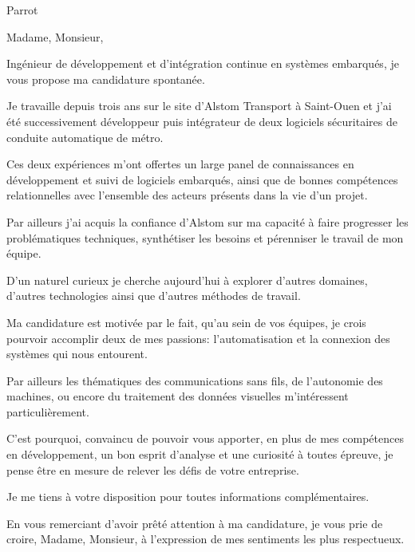 \documentclass[12pt]{lettre}
\makeatletter
\newcommand*{\NoRule}{\renewcommand*{\rule@length}{0}}
\makeatother
\begin{document}
\begin{letter}{Parrot}

  \def\concname{Objet :~}


  \signature{Hoel IRIS}
  \address{Hoel IRIS\\
  54 avenue Mathurin Moreau\\
  75019 Paris\\
  Tel : 06 18 39 30 11\\
  E-Mail : hoel.iris@gmail.com}
  \NoRule
  \notelephone
  \nofax
    \opening{Madame, Monsieur,}
    
    Ingénieur de développement et d'intégration continue en systèmes embarqués, je vous propose ma candidature spontanée.

    Je travaille depuis trois ans sur le site d'Alstom Transport à Saint-Ouen et j'ai été successivement développeur puis intégrateur de deux logiciels sécuritaires de conduite automatique de métro.

    Ces deux expériences m'ont offertes un large panel de connaissances en développement et suivi de logiciels embarqués, ainsi que de bonnes compétences relationnelles avec l'ensemble des acteurs présents dans la vie d'un projet. 

    Par ailleurs j'ai acquis la confiance d'Alstom sur ma capacité à faire progresser les problématiques techniques, synthétiser les besoins et pérenniser le travail de mon équipe.

    D'un naturel curieux je cherche aujourd'hui à explorer d'autres domaines, d'autres technologies ainsi que d'autres méthodes de travail.

    Ma candidature est motivée par le fait, qu'au sein de vos équipes, je crois pourvoir accomplir deux de mes passions: l'automatisation et la connexion des systèmes qui nous entourent.
    
    Par ailleurs les thématiques des communications sans fils, de l'autonomie des machines, ou encore du traitement des données visuelles m'intéressent particulièrement.  

    C'est pourquoi, convaincu de pouvoir vous apporter, en plus de mes compétences en développement, un bon esprit d'analyse et une curiosité à toutes épreuve, je pense être en mesure de relever les défis de votre entreprise.
        
    Je me tiens à votre disposition pour toutes informations complémentaires.
 
    
    \closing{En vous remerciant d’avoir prêté attention à ma candidature, je vous prie de croire, Madame, Monsieur, à l’expression de mes sentiments les plus respectueux.}
    
 
\end{letter}
 
\end{document}
